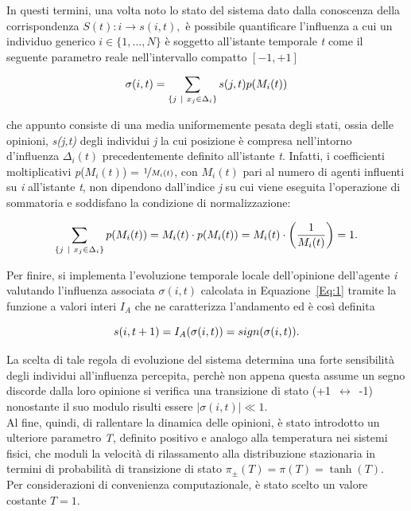 \documentclass[letterpaper,10pt]{article}
\begin{document}
In questi termini, una volta noto lo stato del sistema dato dalla conoscenza della corrispondenza $S(t): i \rightarrow s(i,t), $ è possibile quantificare l'influenza a cui un individuo generico $\textit{i} \in \{1,...,\textit{N} \}$ è soggetto all'istante temporale \textit{t} come il seguente parametro reale nell'intervallo compatto $[-1,+1]$

\begin{equation}
    \sigma(i,t) = \sum_{ \{ j \ | \ x_{j} \in \Delta_{i} \} } s(j, t)p(M_{i}(t))
    \medskip
    \label{Eq:1}
\end{equation}

che appunto consiste di una media uniformemente pesata degli stati, ossia delle opinioni, \textit{s(j,t)} degli individui \textit{j} la cui posizione è compresa nell'intorno d'influenza $\Delta_{i}(t)$ precedentemente definito all'istante \textit{t}. Infatti, i coefficienti moltiplicativi \textit{p}($M_{i}(t)$) = $\nicefrac{1}{M_{i}(t)}$, con $M_{i}(t)$ pari al numero di agenti influenti su \textit{i} all'istante \textit{t}, non dipendono dall'indice \textit{j} su cui viene eseguita l'operazione di sommatoria e soddisfano la condizione di normalizzazione:

\begin{equation}
    \sum_{ \{ j \ | \ x_{j} \in \Delta_{i} \} } p(M_{i}(t)) = M_{i}(t) \cdot p(M_{i}(t)) =    M_{i}(t) \cdot \left ( \frac{1}{M_{i}(t)} \right ) = 1.
    \medskip
    \label{Eq:2}
\end{equation}

Per finire, si implementa l'evoluzione temporale locale dell'opinione dell'agente \textit{i} valutando l'influenza associata $\sigma(i,t)$  calcolata in Equazione~\ref{Eq:1} tramite la funzione a valori interi $I_{A}$ che ne caratterizza l'andamento ed è così definita

\begin{equation}
    s(i,t+1) = I_A(\sigma(i,t)) = sign(\sigma(i,t)).
    \medskip
    \label{Eq:3}
\end{equation}

La scelta di tale regola di evoluzione del sistema determina una forte sensibilità degli individui all'influenza percepita, perchè non appena questa assume un segno discorde dalla loro opinione si verifica una transizione di stato \mbox{(+1 $\longleftrightarrow$ -1)} nonostante il suo modulo risulti essere $|\sigma(i,t)| \ll 1$.
\\ Al fine, quindi, di rallentare la dinamica delle opinioni, è stato introdotto un ulteriore parametro \textit{T}, definito positivo e analogo alla temperatura nei sistemi fisici, che moduli la velocità di rilassamento alla distribuzione stazionaria in termini di probabilità di transizione di stato $ \pi_{\pm}(T) = \pi(T) = \tanh (T)$.
\\ Per considerazioni di convenienza computazionale, è stato scelto un valore costante $T=1$.
\end{document}

